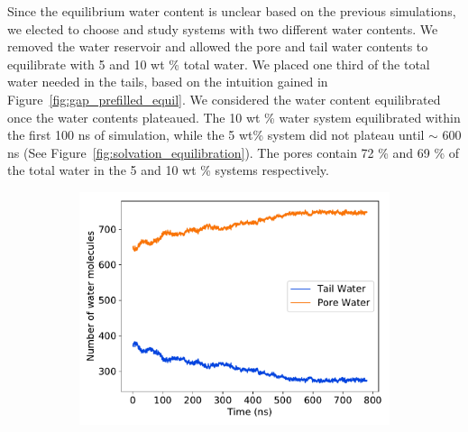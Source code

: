 \documentclass{article}
\begin{document}
  Since the equilibrium water content is unclear based on the previous
  simulations, we elected to choose and study systems with two different water
  contents. We removed the water reservoir and allowed the pore and tail water
  contents to equilibrate with 5 and 10 wt \% total water. We placed one third of
  the total water needed in the tails, based on the intuition gained in
  Figure~\ref{fig:gap_prefilled_equil}. We considered the water content
  equilibrated once the water contents plateaued. The 10 wt \% water system
  equilibrated within the first 100 ns of simulation, while the 5 wt\% system did
  not plateau until $\sim$ 600 ns (See Figure~\ref{fig:solvation_equilibration}).
  The pores contain 72 \% and 69 \% of the total water in the 5 and 10 wt \%
  systems respectively.

  \begin{figure}
  \centering
  \begin{subfigure}{0.45\textwidth}
  \includegraphics[width=\textwidth]{5wt_offset_equil.pdf}
  \caption{}\label{fig:5wt_offset_equil}
  \end{subfigure}
  \begin{subfigure}{0.45\textwidth}

\end{subfigure}
\end{figure}
\end{document}

